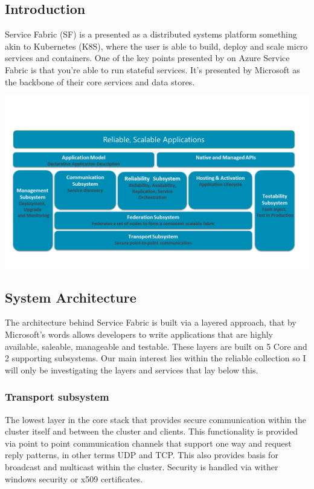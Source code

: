 \documentclass[a4paper,10pt,titlepage]{report}
\begin{document}
    \subsection{Introduction}

    Service Fabric (SF) is a presented as a distributed systems platform something akin to Kubernetes (K8S), where the user is able to build, deploy and scale micro services and containers. One of the key points presented by on Azure Service Fabric is that you're able to run stateful services. It's presented by Microsoft as the backbone of their core services and data stores.\\
    \vspace{5mm}

    \includegraphics[scale=0.5]{images/service-fabric-architecture.png}

    \subsection{System Architecture}

    The architecture behind Service Fabric is built via a layered approach, that by Microsoft's words allows developers to write applications that are highly available, saleable, manageable and testable. These layers are built on 5 Core and 2 supporting subsystems. Our main interest lies within the reliable collection so I will only be investigating the layers and services that lay below this.\\
    \vspace{5mm}

    \subsubsection{Transport subsystem}
    The lowest layer in the core stack that provides secure communication within the cluster itself and between the cluster and clients. This functionality is provided via point to point communication channels that support one way and request reply patterns, in other terms UDP and TCP. This also provides basis for broadcast and multicast within the cluster. Security is handled via wither windows security or x509 certificates. \\
    \vspace{5mm}
\end{document}
